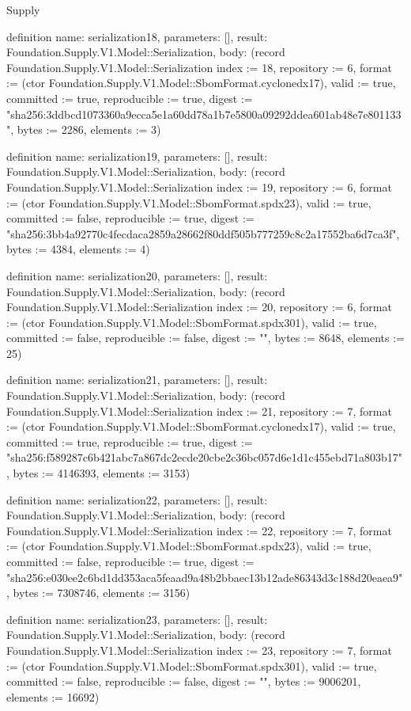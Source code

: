 \begin{lexlean}{Supply}
\begin{semanticmodule}
definition{
  name: serialization18,
  parameters: [],
  result: Foundation.Supply.V1.Model::Serialization,
  body: (record Foundation.Supply.V1.Model::Serialization {index := 18, repository := 6, format := (ctor Foundation.Supply.V1.Model::SbomFormat.cyclonedx17), valid := true, committed := true, reproducible := true, digest := "sha256:3ddbcd1073360a9ecca5e1a60dd78a1b7e5800a09292ddea601ab48e7e801133", bytes := 2286, elements := 3})
}

definition{
  name: serialization19,
  parameters: [],
  result: Foundation.Supply.V1.Model::Serialization,
  body: (record Foundation.Supply.V1.Model::Serialization {index := 19, repository := 6, format := (ctor Foundation.Supply.V1.Model::SbomFormat.spdx23), valid := true, committed := false, reproducible := true, digest := "sha256:3bb4a92770c4fecdaca2859a28662f80ddf505b777259c8c2a17552ba6d7ca3f", bytes := 4384, elements := 4})
}

definition{
  name: serialization20,
  parameters: [],
  result: Foundation.Supply.V1.Model::Serialization,
  body: (record Foundation.Supply.V1.Model::Serialization {index := 20, repository := 6, format := (ctor Foundation.Supply.V1.Model::SbomFormat.spdx301), valid := true, committed := false, reproducible := false, digest := "", bytes := 8648, elements := 25})
}

definition{
  name: serialization21,
  parameters: [],
  result: Foundation.Supply.V1.Model::Serialization,
  body: (record Foundation.Supply.V1.Model::Serialization {index := 21, repository := 7, format := (ctor Foundation.Supply.V1.Model::SbomFormat.cyclonedx17), valid := true, committed := true, reproducible := true, digest := "sha256:f589287c6b421abc7a867dc2ecde20cbe2c36bc057d6e1d1c455ebd71a803b17", bytes := 4146393, elements := 3153})
}

definition{
  name: serialization22,
  parameters: [],
  result: Foundation.Supply.V1.Model::Serialization,
  body: (record Foundation.Supply.V1.Model::Serialization {index := 22, repository := 7, format := (ctor Foundation.Supply.V1.Model::SbomFormat.spdx23), valid := true, committed := false, reproducible := true, digest := "sha256:e030ee2c6bd1dd353aca5feaad9a48b2bbaec13b12ade86343d3c188d20eaea9", bytes := 7308746, elements := 3156})
}

definition{
  name: serialization23,
  parameters: [],
  result: Foundation.Supply.V1.Model::Serialization,
  body: (record Foundation.Supply.V1.Model::Serialization {index := 23, repository := 7, format := (ctor Foundation.Supply.V1.Model::SbomFormat.spdx301), valid := true, committed := false, reproducible := false, digest := "", bytes := 9006201, elements := 16692})
}


\end{semanticmodule}
\end{lexlean}
